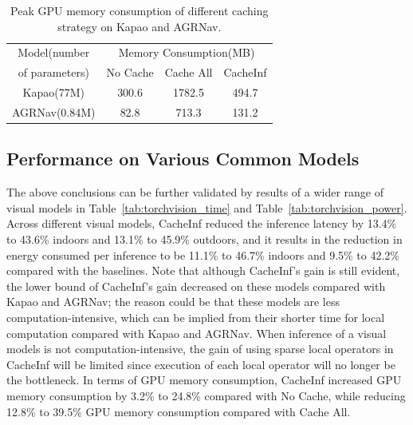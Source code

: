 \begin{table}[htb]
    \vspace{-0.2cm}
    \renewcommand\arraystretch{0.95}
\centering
\begin{tabular}{c|c|c|c}
\toprule
Model(number & \multicolumn{3}{|c}{Memory Consumption(MB)} \\
 of parameters) & No Cache & Cache All & CacheInf \\
\midrule
Kapao(77M) & 300.6 & 1782.5 & 494.7\\
\hline
AGRNav(0.84M) & 82.8 & 713.3 & 131.2\\
\bottomrule
\end{tabular}

    \caption{Peak GPU memory consumption of different caching strategy on Kapao and AGRNav. }
    \label{tab:e2e_mem}
    \vspace{-0.7cm}
\end{table}

\subsection{Performance on Various Common Models}
The above conclusions can be further validated by results of a wider range of visual models in Table~\ref{tab:torchvision_time} and Table~\ref{tab:torchvision_power}.
Across different visual models, CacheInf reduced the inference latency by 13.4\% to 43.6\% indoors and 13.1\% to 45.9\% outdoors, and it results in the reduction in energy consumed per inference to be 11.1\% to 46.7\% indoors and 9.5\% to 42.2\%
compared with the baselines.
Note that although CacheInf's gain is still evident, the lower bound of CacheInf's gain decreased on these models compared with Kapao and AGRNav; the reason could be that these models are less computation-intensive, which can be implied from their shorter time for local computation compared with Kapao and AGRNav.
When inference of a visual models is not computation-intensive, the gain of using sparse local operators in CacheInf will be limited since execution of each local operator will no longer be the bottleneck.
In terms of GPU memory consumption, CacheInf increased GPU memory consumption by 3.2\% to 24.8\% compared with No Cache, while reducing 12.8\% to 39.5\% GPU memory consumption compared with Cache All.

